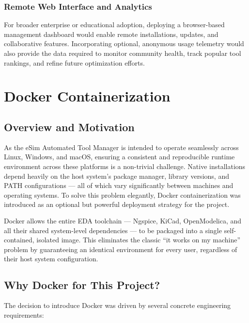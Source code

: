 \documentclass[12pt,a4paper]{report}
\begin{document}
\subsection{Remote Web Interface and Analytics}
For broader enterprise or educational adoption, deploying a browser-based management dashboard would enable remote installations, updates, and collaborative features. Incorporating optional, anonymous usage telemetry would also provide the data required to monitor community health, track popular tool rankings, and refine future optimization efforts.


\chapter{Docker Containerization}
\section{Overview and Motivation}
As the eSim Automated Tool Manager is intended to operate seamlessly across Linux, Windows, and macOS, ensuring a consistent and reproducible runtime environment across these platforms is a non-trivial challenge. Native installations depend heavily on the host system's package manager, library versions, and PATH configurations — all of which vary significantly between machines and operating systems. To solve this problem elegantly, Docker containerization was introduced as an optional but powerful deployment strategy for the project.

Docker allows the entire EDA toolchain — Ngspice, KiCad, OpenModelica, and all their shared system-level dependencies — to be packaged into a single self-contained, isolated image. This eliminates the classic ``it works on my machine'' problem by guaranteeing an identical environment for every user, regardless of their host system configuration.

\section{Why Docker for This Project?}
The decision to introduce Docker was driven by several concrete engineering requirements:
\end{document}
